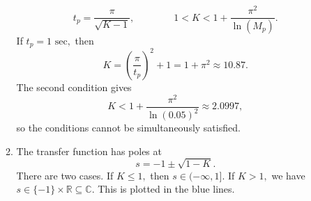 \documentclass{article}
\numberwithin{equation}{section}
\begin{document}
\begin{enumerate}[label=\textbf{1.\arabic*}]
\begin{enumerate}[label=(\alph*)]
\begin{equation}
            t_p = \frac{\pi}{\sqrt{K-1}},\quad\quad\quad\quad 1 < K < 1 + \frac{\pi^2}{\ln(M_p)}.
        \end{equation}
        If $t_p=1\text{ sec},$ then 
        \begin{equation}
            K = \left(\frac{\pi}{t_p}\right)^2 + 1 = 1 + \pi^2 \approx 10.87.
        \end{equation}
        The second condition gives 
        \begin{equation}
            K < 1 + \frac{\pi^2}{\ln(0.05)^2} \approx 2.0997,
        \end{equation}
        so the conditions cannot be simultaneously satisfied.
        \item The transfer function has poles at 
        \begin{equation}
            s = -1 \pm \sqrt{1-K}.
        \end{equation}
        There are two cases. If $K \le 1,$ then $s \in (-\infty, 1].$ If $K > 1,$ we have $s \in \{-1\} \times \mathbb{R} \subseteq \mathbb{C}.$ This is plotted in the blue lines.


\end{enumerate}
\end{enumerate}
\end{document}
